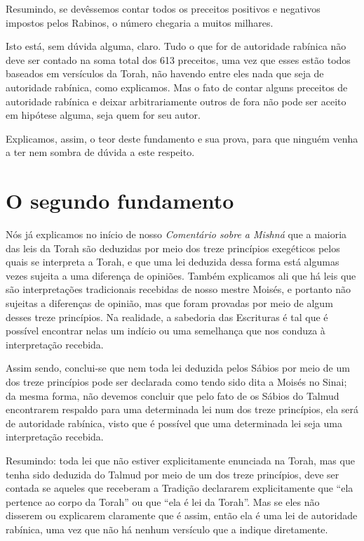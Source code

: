 Resumindo, se devêssemos contar todos os preceitos positivos e
negativos impostos pelos Rabinos, o número chegaria a muitos milhares.

Isto está, sem dúvida alguma, claro. Tudo o que for de autoridade
rabínica não deve ser contado na soma total dos 613 preceitos, uma vez
que esses estão todos baseados em versículos da Torah, não havendo entre
eles nada que seja de autoridade rabínica, como explicamos. Mas o fato
de contar alguns preceitos de autoridade rabínica e deixar
arbitrariamente outros de fora não pode ser aceito em hipótese alguma,
seja quem for seu autor.

Explicamos, assim, o teor deste fundamento e sua prova, para que ninguém
venha a ter nem sombra de dúvida a este respeito.

\chapter*{O segundo fundamento}

Nós já explicamos no início de nosso \emph{Comentário sobre a Mishná}
que a maioria das leis da Torah são deduzidas por meio dos treze
princípios exegéticos pelos quais se interpreta a Torah, e que uma lei
deduzida dessa forma está algumas vezes sujeita a uma diferença de
opiniões. Também explicamos ali que há leis que são interpretações
tradicionais recebidas de nosso mestre Moisés, e portanto não sujeitas
a diferenças de opinião, mas que foram provadas por meio de algum
desses treze princípios. Na realidade, a sabedoria das Escrituras é tal
que é possível encontrar nelas um indício ou uma semelhança que nos
conduza à interpretação recebida.

Assim sendo, conclui-se que nem toda lei deduzida pelos Sábios por meio
de um dos treze princípios pode ser declarada como tendo sido dita a
Moisés no Sinai; da mesma forma, não devemos concluir que pelo fato de
os Sábios do Talmud encontrarem respaldo para uma determinada lei num
dos treze princípios, ela será de autoridade rabínica, visto que é
possível que uma
determinada lei seja uma interpretação recebida.

Resumindo: toda lei que não estiver explicitamente enunciada na Torah,
mas que tenha sido deduzida do Talmud por meio de um dos treze
princípios, deve ser contada se aqueles que receberam a Tradição
declararem explicitamente que ``ela pertence ao corpo da Torah'' ou que
``ela é lei da Torah''. Mas se eles não disserem ou explicarem
claramente que é assim, então ela é uma lei de autoridade rabínica, uma
vez que não há nenhum versículo que a indique diretamente.

